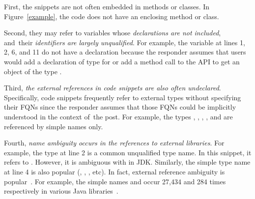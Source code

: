 First, the snippets are not often embedded in methods or classes. In
Figure~\ref{example}, the code does not have an enclosing method or
class.

Second, they may refer to variables whose {\em declarations are not
  included}, and~their {\em identifiers are largely unqualified}. For
example, the variable  at lines 1, 2, 6, and 11 do not
have a declaration because the responder assumes that users would add
a declaration of type  for  or add a
method call to the API  to get an object of
the type .
%
%

Third, {\em the external references in code snippets are also often
  undeclared}. Specifically, code snippets frequently refer to
external types without specifying their FQNs since the
responder assumes that those FQNs could be implicitly understood in
the context of~the post.
%
%
%
For example, the types , ,
, , and  are
referenced by simple names only.


Fourth, {\em name ambiguity occurs in the references to external
  libraries}. For example, the type  at line 2 is
a common unqualified type name. In this snippet, it refers to
. However, it is
ambiguous with  in JDK. Similarly, the
simple type name  at line 4 is also popular
(,
, ,
etc).
In fact, external reference ambiguity is
popular~\cite{dagenais-icse12}.
%
For example, the simple names  and  occur 27,434
and 284 times respectively in various Java libraries~\cite{liveapi14}.


